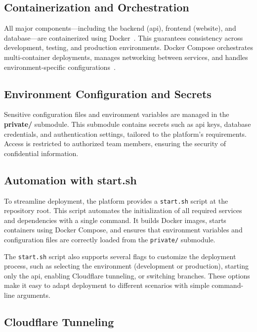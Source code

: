 \subsection{Containerization and Orchestration} \label{subsec:containerization}

All major components—including the backend (\ac{api}), frontend (website), and database—are containerized using Docker~\cite{docker-docs}. This guarantees consistency across development, testing, and production environments. Docker Compose orchestrates multi-container deployments, manages networking between services, and handles environment-specific configurations~\cite{docker-compose-docs}.

\subsection{Environment Configuration and Secrets} \label{subsec:env_config}

Sensitive configuration files and environment variables are managed in the \textbf{private/} submodule. This submodule contains secrets such as \ac{api} keys, database credentials, and authentication settings, tailored to the platform's requirements. Access is restricted to authorized team members, ensuring the security of confidential information.

\subsection{Automation with start.sh} \label{subsec:automation_startsh}

To streamline deployment, the platform provides a \texttt{start.sh} script at the repository root. This script automates the initialization of all required services and dependencies with a single command. It builds Docker images, starts containers using Docker Compose, and ensures that environment variables and configuration files are correctly loaded from the \texttt{private/} submodule.

The \texttt{start.sh} script also supports several flags to customize the deployment process, such as selecting the environment (development or production), starting only the \ac{api}, enabling Cloudflare tunneling, or switching branches. These options make it easy to adapt deployment to different scenarios with simple command-line arguments.

\subsection{Cloudflare Tunneling} \label{subsec:cloudflare_tunneling}

